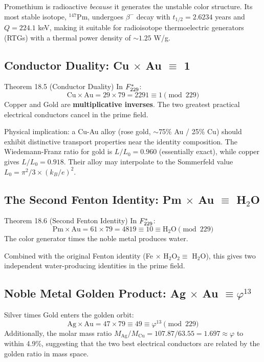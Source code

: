 \noindent Promethium is radioactive \emph{because} it generates the unstable color structure. Its most stable isotope, ${}^{147}$Pm, undergoes $\beta^-$ decay with $t_{1/2} = 2.6234$ years and $Q = 224.1$ keV, making it suitable for radioisotope thermoelectric generators (RTGs) with a thermal power density of $\sim 1.25$ W/g.

\subsection{Conductor Duality: Cu $\times$ Au $\equiv$ 1}

\begin{theorembox}{Theorem 18.5 (Conductor Duality)}
In $F_{229}^*$:
\[ \text{Cu} \times \text{Au} = 29 \times 79 = 2291 \equiv 1 \pmod{229} \]
Copper and Gold are \textbf{multiplicative inverses}. The two greatest practical electrical conductors cancel in the prime field.
\end{theorembox}

\noindent Physical implication: a Cu-Au alloy (rose gold, $\sim$75\% Au / 25\% Cu) should exhibit distinctive transport properties near the identity composition. The Wiedemann-Franz ratio for gold is $L/L_0 = 0.960$ (essentially exact), while copper gives $L/L_0 = 0.918$. Their alloy may interpolate to the Sommerfeld value $L_0 = \pi^2/3 \times (k_B/e)^2$.

\subsection{The Second Fenton Identity: Pm $\times$ Au $\equiv$ H$_2$O}

\begin{theorembox}{Theorem 18.6 (Second Fenton Identity)}
In $F_{229}^*$:
\[ \text{Pm} \times \text{Au} = 61 \times 79 = 4819 \equiv 10 \equiv \text{H}_2\text{O} \pmod{229} \]
The color generator times the noble metal produces water.
\end{theorembox}

\noindent Combined with the original Fenton identity (Fe $\times$ H$_2$O$_2 \equiv$ H$_2$O), this gives two independent water-producing identities in the prime field.

\subsection{Noble Metal Golden Product: Ag $\times$ Au $\equiv \varphi^{13}$}

Silver times Gold enters the golden orbit:
\[ \text{Ag} \times \text{Au} = 47 \times 79 \equiv 49 \equiv \varphi^{13} \pmod{229} \]
Additionally, the molar mass ratio $M_{\text{Ag}} / M_{\text{Cu}} = 107.87 / 63.55 = 1.697 \approx \varphi$ to within 4.9\%, suggesting that the two best electrical conductors are related by the golden ratio in mass space.

